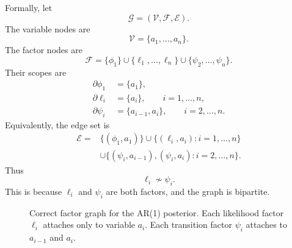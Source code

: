 \documentclass[11pt]{article}
\begin{document}
Formally, let
\begin{equation}
  \mathcal G=(\mathcal V,\mathcal F,\mathcal E).
\end{equation}
The variable nodes are
\begin{equation}
  \mathcal V=\{a_1,\ldots,a_n\}.
\end{equation}
The factor nodes are
\begin{equation}
  \mathcal F
  =\{\phi_1\}\cup\{\ell_1,\ldots,\ell_n\}\cup\{\psi_2,\ldots,\psi_n\}.
\end{equation}
Their scopes are
\begin{align}
  \partial \phi_1 &= \{a_1\}, \\
  \partial \ell_i &= \{a_i\}, \qquad i=1,\ldots,n, \\
  \partial \psi_i &= \{a_{i-1},a_i\}, \qquad i=2,\ldots,n.
\end{align}
Equivalently, the edge set is
\begin{equation}
\begin{aligned}
  \mathcal E
  ={}&\{(\phi_1,a_1)\}
  \cup \{(\ell_i,a_i):i=1,\ldots,n\} \\
  &\cup \{(\psi_i,a_{i-1}),(\psi_i,a_i):i=2,\ldots,n\}.
\end{aligned}
\end{equation}
Thus
\begin{equation}
  \ell_i \not\sim \psi_i.
\end{equation}
This is because \(\ell_i\) and \(\psi_i\) are both factors, and the graph is bipartite.

\begin{figure}[h!]
\centering
{}
\caption{Correct factor graph for the AR(1) posterior. Each likelihood factor \(\ell_i\) attaches only to variable \(a_i\). Each transition factor \(\psi_i\) attaches to \(a_{i-1}\) and \(a_i\).}
\end{figure}
\end{document}
